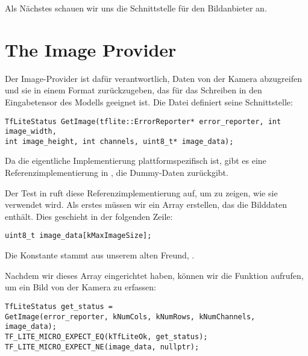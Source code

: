 Als Nächstes schauen wir uns die Schnittstelle für den Bildanbieter an.



\section{The Image Provider}

Der Image-Provider ist dafür verantwortlich, Daten von der Kamera abzugreifen und sie in einem Format zurückzugeben, das für das Schreiben in den Eingabetensor des Modells geeignet ist. Die Datei  definiert seine Schnittstelle:

\begin{code}
    \begin{lstlisting}
TfLiteStatus GetImage(tflite::ErrorReporter* error_reporter, int image_width,
int image_height, int channels, uint8_t* image_data);
  \end{lstlisting}
\end{code}

Da die eigentliche Implementierung plattformspezifisch ist, gibt es eine Referenzimplementierung in , die Dummy-Daten zurückgibt.

Der Test in  ruft diese Referenzimplementierung auf, um zu zeigen, wie sie verwendet wird. Als erstes müssen wir ein Array erstellen, das die Bilddaten enthält. Dies geschieht in der folgenden Zeile:

\begin{code}
    \begin{lstlisting}
uint8_t image_data[kMaxImageSize];
  \end{lstlisting}
\end{code}

Die Konstante  stammt aus unserem alten Freund, .

Nachdem wir dieses Array eingerichtet haben, können wir die Funktion  aufrufen, um ein Bild von der Kamera zu erfassen:

\begin{code}
    \begin{lstlisting}
TfLiteStatus get_status =
GetImage(error_reporter, kNumCols, kNumRows, kNumChannels, image_data);
TF_LITE_MICRO_EXPECT_EQ(kTfLiteOk, get_status);
TF_LITE_MICRO_EXPECT_NE(image_data, nullptr);
  \end{lstlisting}
\end{code}

